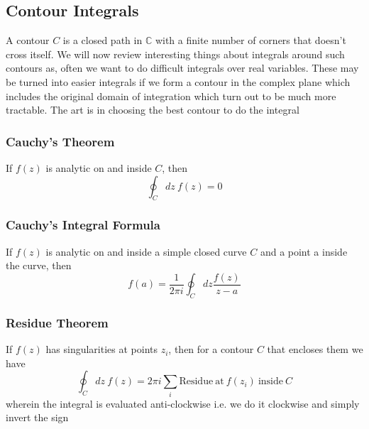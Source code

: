 \subsection{Contour Integrals}
A contour $C$ is a closed path in $\mathbb{C}$ with a finite number of corners that doesn't cross itself. We will now review interesting things about integrals around such contours as, often we want to do difficult integrals over real variables. These may
be turned into easier integrals if we form a contour in the complex plane
which includes the original domain of integration which turn out to be much more tractable. The art is in choosing the best contour to do the integral
\subsubsection{Cauchy's Theorem}
If $f(z)$ is analytic on and inside $C$, then
\begin{equation}
    \oint_{C} dz \ f(z) = 0
\end{equation}
\subsubsection{Cauchy's Integral Formula}
If $f(z)$ is analytic on and inside a simple closed curve $C$ and a point a inside the curve, then 
\begin{equation}
    f(a) = \frac{1}{2 \pi i} \oint_{C} dz \frac{f(z)}{z-a}
\end{equation}
\subsubsection{Residue Theorem}
If $f(z)$ has singularities at points $z_{i}$, then for a contour $C$ that encloses them we have
\begin{equation}
    \oint_{C}dz \ f(z) = 2 \pi i \sum_{i} \text{Residue} \ \text{at} \ f(z_{i}) \ \text{inside} \ C
\end{equation}
wherein the integral is evaluated anti-clockwise i.e. we do it clockwise and simply invert the sign
